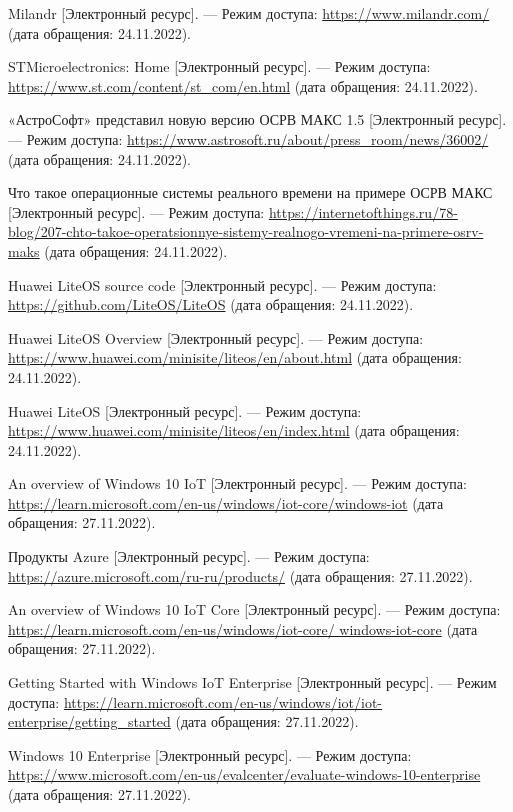 \begin{thebibliography}{}
	Milandr [Электронный ресурс]. — Режим доступа: \url{https://www.milandr.com/} (дата обращения: 24.11.2022).
	
	STMicroelectronics: Home [Электронный ресурс]. — Режим доступа: \url{https://www.st.com/content/st_com/en.html} (дата обращения: 24.11.2022).
	
	«АстроСофт» представил новую версию ОСРВ МАКС 1.5
	[Электронный ресурс]. — Режим доступа: \url{https://www.astrosoft.ru/about/press_room/news/36002/} (дата обращения: 24.11.2022).
	
	Что такое операционные системы реального времени на
	примере ОСРВ МАКС [Электронный ресурс]. — Режим доступа: \url{https://internetofthings.ru/78-blog/207-chto-takoe-operatsionnye-sistemy-realnogo-vremeni-na-primere-osrv-maks} (дата обращения:
	24.11.2022).
	
	Huawei LiteOS source code [Электронный ресурс]. — Режим доступа: \url{https://github.com/LiteOS/LiteOS} (дата обращения:
	24.11.2022).
	
	Huawei LiteOS Overview [Электронный ресурс]. — Режим доступа: \url{https://www.huawei.com/minisite/liteos/en/about.html} (дата
	обращения: 24.11.2022).
	
	Huawei LiteOS [Электронный ресурс]. — Режим доступа: \url{https://www.huawei.com/minisite/liteos/en/index.html} (дата обращения:
	24.11.2022).
	
	An overview of Windows 10 IoT [Электронный ресурс]. — Режим доступа: \url{https://learn.microsoft.com/en-us/windows/iot-core/windows-iot} (дата обращения: 27.11.2022).
	
	Продукты Azure [Электронный ресурс]. — Режим доступа: \url{https://azure.microsoft.com/ru-ru/products/} (дата обращения:
	27.11.2022).
	
	An overview of Windows 10 IoT Core [Электронный ресурс]. —
	Режим доступа: \url{https://learn.microsoft.com/en-us/windows/iot-core/
	windows-iot-core} (дата обращения: 27.11.2022).
	
	Getting Started with Windows IoT Enterprise [Электронный ресурс]. — Режим доступа: \url{https://learn.microsoft.com/en-us/windows/iot/iot-enterprise/getting_started} (дата обращения: 27.11.2022).
	
	Windows 10 Enterprise [Электронный ресурс]. — Режим доступа: \url{https://www.microsoft.com/en-us/evalcenter/evaluate-windows-10-enterprise} (дата обращения: 27.11.2022).
	

\end{thebibliography}
